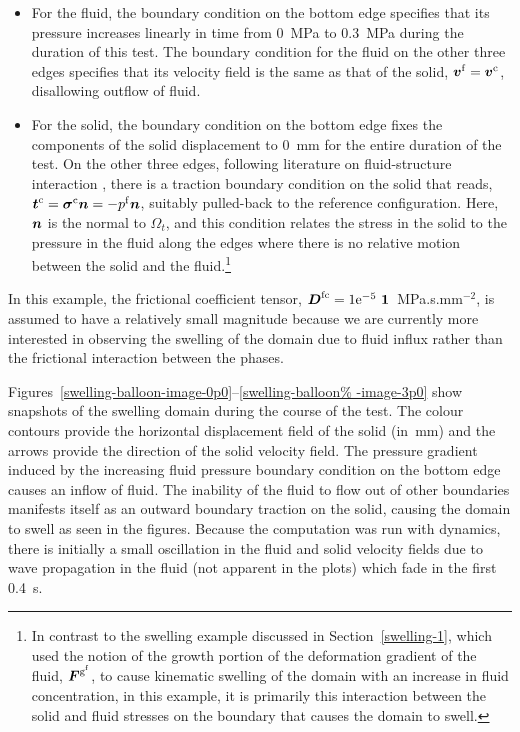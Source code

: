 \begin{itemize}
\item For the fluid, the boundary condition on the bottom edge
  specifies that its pressure increases linearly in time from 0~MPa to
  0.3~MPa during the duration of this test. The boundary condition for
  the fluid on the other three edges specifies that its velocity field
  is the same as that of the solid, $\mbox{\boldmath$ v$}^{\mathrm{f}} =
  \mbox{\boldmath$ v$}^{\mathrm{c}}$, disallowing outflow of fluid.
\item For the solid, the boundary condition on the bottom edge fixes
  the components of the solid displacement to 0~mm for the entire
  duration of the test. On the other three edges, following literature
  on fluid-structure interaction \citep{doneaetal2004}, there is a
  traction boundary condition on the solid that reads,
  $\mbox{\boldmath$ t$}^{\mathrm{c}}=\mbox{\boldmath$\sigma$}^{\mathrm{c}} \mbox{\boldmath$ n$} = -p^{\mathrm{f}} \mbox{\boldmath$ n$}$,
  suitably pulled-back to the reference configuration. Here, $\mbox{\boldmath$ n$}$ is
  the normal to $\Omega_{t}$, and this condition relates the stress in
  the solid to the pressure in the fluid along the edges where there
  is no relative motion between the solid and the fluid.\footnote{In
    contrast to the swelling example discussed in
    Section~\ref{swelling-1}, which used the notion of the growth
    portion of the deformation gradient of the fluid,
    $\mbox{\boldmath$ F$}^{\mathrm{g}^\mathrm{f}}$, to cause kinematic swelling of the
    domain with an increase in fluid concentration, in this example,
    it is primarily this interaction between the solid and fluid
    stresses on the boundary that causes the domain to swell.}
\end{itemize}

In this example, the frictional coefficient tensor, $\bD^{\mathrm{fc}}
= 1\mathrm{e}^{-5} \ \bone$~MPa.s.mm$^{-2}$, is assumed to have a
relatively small magnitude because we are currently more interested in
observing the swelling of the domain due to fluid influx rather than
the frictional interaction between the phases.

Figures~\ref{swelling-balloon-image-0p0}--\ref{swelling-balloon%
  -image-3p0} show snapshots of the swelling domain during the course
of the test. The colour contours provide the horizontal displacement
field of the solid (in~mm) and the arrows provide the direction of the
solid velocity field. The pressure gradient induced by the increasing
fluid pressure boundary condition on the bottom edge causes an inflow
of fluid. The inability of the fluid to flow out of other boundaries
manifests itself as an outward boundary traction on the solid, causing
the domain to swell as seen in the figures.  Because the computation
was run with dynamics, there is initially a small oscillation in the
fluid and solid velocity fields due to wave propagation in the fluid
(not apparent in the plots) which fade in the first 0.4~s.

